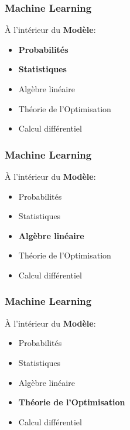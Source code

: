 \documentclass{formation}
\begin{document}
\begin{frame}
  \frametitle{Machine Learning}
  \begin{minipage}[c]{0.41\linewidth}
    À l'intérieur du \textbf{Modèle}:
    \begin{itemize}
    \item \textbf{Probabilités}
    \item \textbf{Statistiques}
    \item Algèbre linéaire
    \item Théorie de l'Optimisation
    \item Calcul différentiel
    \end{itemize}
  \end{minipage}\hfill
  \begin{minipage}[c]{0.58\linewidth}
  \end{minipage}\hfill
\end{frame}

\begin{frame}
  \frametitle{Machine Learning}
  \begin{minipage}[c]{0.41\linewidth}
    À l'intérieur du \textbf{Modèle}:
    \begin{itemize}
    \item Probabilités
    \item Statistiques
    \item \textbf{Algèbre linéaire}
    \item Théorie de l'Optimisation
    \item Calcul différentiel
    \end{itemize}
  \end{minipage}\hfill
  \begin{minipage}[c]{0.58\linewidth}
  \end{minipage}\hfill
\end{frame}

\begin{frame}
  \frametitle{Machine Learning}
  \begin{minipage}[c]{0.45\linewidth}
    À l'intérieur du \textbf{Modèle}:
    \begin{itemize}
    \item Probabilités
    \item Statistiques
    \item Algèbre linéaire
    \item \textbf{Théorie de l'Optimisation}
    \item Calcul différentiel
    \end{itemize}
  \end{minipage}\hfill
  \begin{minipage}[c]{0.55\linewidth}
  \end{minipage}\hfill
\end{frame}
\end{document}
